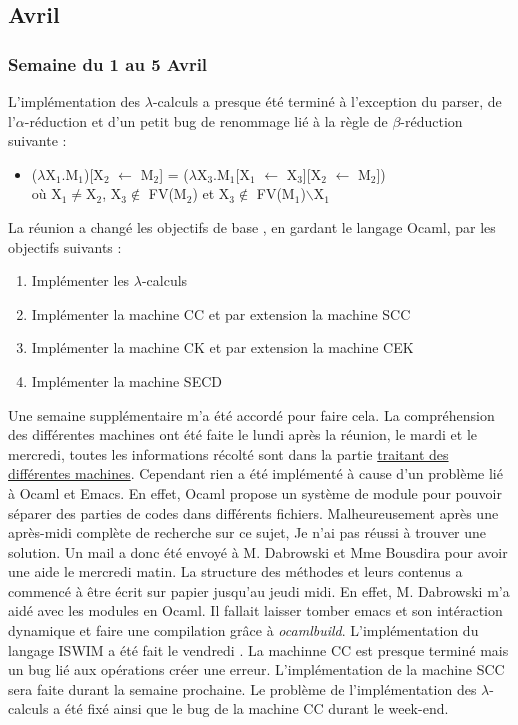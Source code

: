 \documentclass[10pt,a4paper]{article}
\begin{document}
		\subsection{Avril}
		
		\subsubsection{Semaine du 1 au 5 Avril}
		L'implémentation des $\lambda$-calculs a presque été terminé à l'exception du parser, de l'$\alpha$-réduction et d'un petit bug de renommage lié à la règle de $\beta$-réduction suivante :
		\smallbreak
		\begin{itemize}
			\item [] ($\lambda$X$_{1}$.M$_{1}$)[X$_{2}$ $\leftarrow$ M$_{2}$] = ($\lambda$X$_{3}$.M$_{1}$[X$_{1}$ $\leftarrow$ X$_{3}$][X$_{2}$ $\leftarrow$ M$_{2}$]) 
			\\où X$_{1}$$\neq$X$_{2}$, X$_{3}$$\notin$ FV(M$_{2}$) 
			et X$_{3}$$\notin$ FV(M$_{1}$)$\backslash${X$_{1}$} 
		\end{itemize}
		La réunion a changé les objectifs de base , en gardant le langage Ocaml, par les objectifs suivants : 
		\begin{enumerate}
			\item Implémenter les $\lambda$-calculs
			\item Implémenter la machine CC et par extension la machine SCC
			\item Implémenter la machine CK et par extension la machine CEK
			\item Implémenter la machine SECD
		\end{enumerate}
		Une semaine supplémentaire m'a été accordé pour faire cela.
		\medbreak
		La compréhension des différentes machines ont été faite le lundi après la réunion, le mardi et le mercredi, toutes les informations récolté sont dans la partie \hyperref[Machine]{traitant des différentes machines}. \smallbreak
		Cependant rien a été implémenté à cause d'un problème lié à Ocaml et Emacs. En effet, Ocaml propose un système de module pour pouvoir séparer des parties de codes dans différents fichiers.
		\smallbreak
		Malheureusement après une après-midi complète de recherche sur ce sujet, Je n'ai pas réussi à trouver une solution. Un mail a donc été envoyé à M. Dabrowski et Mme Bousdira pour avoir une aide le mercredi matin.
		\smallbreak 
		La structure des méthodes et leurs contenus a commencé à être écrit sur papier jusqu'au jeudi midi. En effet, M. Dabrowski m'a aidé avec les modules en Ocaml. Il fallait laisser tomber emacs et son intéraction dynamique et faire une compilation grâce à \textit{ocamlbuild}.
		\smallbreak
		L'implémentation du langage ISWIM a été fait le vendredi . La machinne CC est presque terminé mais un bug lié aux opérations créer une erreur. L'implémentation de la machine SCC sera faite durant la semaine prochaine. Le problème de l'implémentation des $\lambda$-calculs a été fixé ainsi que le bug de la machine CC durant le week-end.
		
\end{document}
